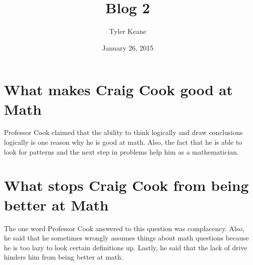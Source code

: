 \documentclass[a4paper]{article}
\title{Blog 2}
\author{Tyler Keane}
\date{January 26, 2015}
\begin{document}
\maketitle



\section{What makes Craig Cook good at Math}

Professor Cook claimed that the ability to think logically and draw conclusions logically is one reason why he is good at math. Also, the fact that he is able to look for patterns and the next step in problems help him as a mathematician.

\section{What stops Craig Cook from being better at Math}
\label{sec:examples}


The one word Professor Cook answered to this question was complacency. Also, he said that he sometimes wrongly assumes things about math questions because he is too lazy to look certain definitions up. Lastly, he said that the lack of drive hinders him from being better at math. 
\end{document}
